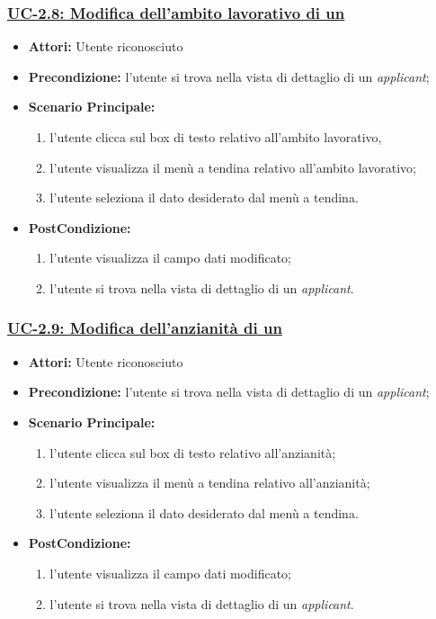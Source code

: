 \subsubsection{\underline{UC-2.8: Modifica dell'ambito lavorativo di un \applicant}}
\begin{itemize}
	\item \textbf{Attori:} Utente riconosciuto
	\item \textbf{Precondizione:}  l'utente si trova nella vista di dettaglio di un \textit{applicant};
	\item \textbf{Scenario Principale:}
	\begin{enumerate}
		\item l'utente clicca sul box di testo relativo all'ambito lavorativo,
		\item l'utente visualizza il  menù a tendina relativo all'ambito lavorativo;
		\item l'utente seleziona il dato desiderato dal menù a tendina.
	\end{enumerate}
	\item \textbf{PostCondizione:} 
	\begin{enumerate}
		\item l'utente visualizza il campo dati modificato;
		\item l'utente si trova nella vista di dettaglio di un \textit{applicant}.
	\end{enumerate}
	
\end{itemize}

\subsubsection{\underline{UC-2.9: Modifica dell'anzianità di un \applicant}}
\begin{itemize}
	\item \textbf{Attori:} Utente riconosciuto
	\item \textbf{Precondizione:}  l'utente si trova nella vista di dettaglio di un \textit{applicant};
	\item \textbf{Scenario Principale:}
	\begin{enumerate}
		\item l'utente clicca sul box di testo relativo all'anzianità;
		\item l'utente visualizza il menù a tendina relativo all'anzianità;
		\item l'utente seleziona il dato desiderato dal menù a tendina.
	\end{enumerate}
	\item \textbf{PostCondizione:} 
	\begin{enumerate}
		\item l'utente visualizza il campo dati modificato;
		\item l'utente si trova nella vista di dettaglio di un \textit{applicant}.
	\end{enumerate}
	
\end{itemize}

